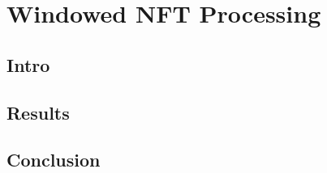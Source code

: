 \chapter{Windowed NFT Processing}

\section{Intro}





\section{Results}


\section{Conclusion}


% 
